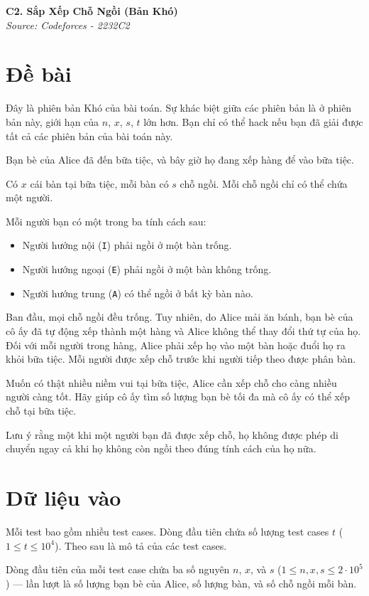 \documentclass[11pt]{article}
\newcommand{\problem}[2]{
    \begin{problembox}
    \begin{center}
        \Large \textbf{#1} \\
        \vspace{0.2cm}
        \small \textit{Source: #2}
    \end{center}
    \end{problembox}
}
\begin{document}
\newpage
\problem{C2. Sắp Xếp Chỗ Ngồi (Bản Khó)}{Codeforces - 2232C2}

\section*{Đề bài}
Đây là phiên bản Khó của bài toán. Sự khác biệt giữa các phiên bản là ở phiên bản này, giới hạn của $n$, $x$, $s$, $t$ lớn hơn. Bạn chỉ có thể hack nếu bạn đã giải được tất cả các phiên bản của bài toán này.

Bạn bè của Alice đã đến bữa tiệc, và bây giờ họ đang xếp hàng để vào bữa tiệc.

Có $x$ cái bàn tại bữa tiệc, mỗi bàn có $s$ chỗ ngồi. Mỗi chỗ ngồi chỉ có thể chứa một người.

Mỗi người bạn có một trong ba tính cách sau:
\begin{itemize}
    \item Người hướng nội (\texttt{I}) phải ngồi ở một bàn trống.
    \item Người hướng ngoại (\texttt{E}) phải ngồi ở một bàn không trống.
    \item Người hướng trung (\texttt{A}) có thể ngồi ở bất kỳ bàn nào.
\end{itemize}

Ban đầu, mọi chỗ ngồi đều trống. Tuy nhiên, do Alice mải ăn bánh, bạn bè của cô ấy đã tự động xếp thành một hàng và Alice không thể thay đổi thứ tự của họ. Đối với mỗi người trong hàng, Alice phải xếp họ vào một bàn hoặc đuổi họ ra khỏi bữa tiệc. Mỗi người được xếp chỗ trước khi người tiếp theo được phân bàn.

Muốn có thật nhiều niềm vui tại bữa tiệc, Alice cần xếp chỗ cho càng nhiều người càng tốt. Hãy giúp cô ấy tìm số lượng bạn bè tối đa mà cô ấy có thể xếp chỗ tại bữa tiệc.

Lưu ý rằng một khi một người bạn đã được xếp chỗ, họ không được phép di chuyển ngay cả khi họ không còn ngồi theo đúng tính cách của họ nữa.

\section*{Dữ liệu vào}
Mỗi test bao gồm nhiều test cases. Dòng đầu tiên chứa số lượng test cases $t$ ($1 \le t \le 10^4$). Theo sau là mô tả của các test cases.

Dòng đầu tiên của mỗi test case chứa ba số nguyên $n$, $x$, và $s$ ($1 \le n, x, s \le 2\cdot 10^5$) — lần lượt là số lượng bạn bè của Alice, số lượng bàn, và số chỗ ngồi mỗi bàn. 
\end{document}
